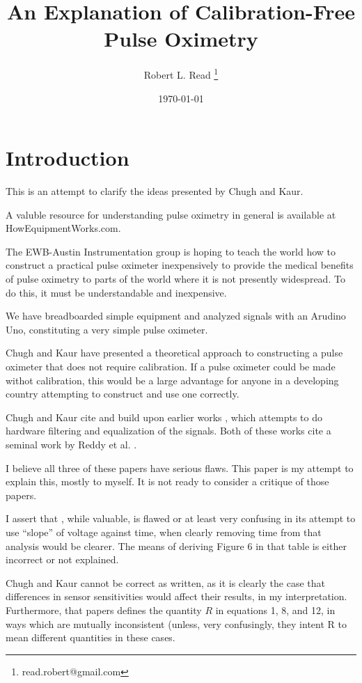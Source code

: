 \documentclass[11pt]{article}
\title{An Explanation of Calibration-Free Pulse Oximetry}
\author{Robert L. Read
  \thanks{read.robert@gmail.com}
}
\affil{Founder, Public Invention, an educational non-profit.}
\date{\today}
\begin{document}
\maketitle


\section{Introduction}

This is an attempt to clarify the ideas presented by Chugh and Kaur\cite{ChughAndKaur2015}.

A valuble resource for understanding pulse oximetry in general is available at HowEquipmentWorks.com\cite{howPulseOx}.

The EWB-Austin Instrumentation group is hoping to teach the world how to construct a practical pulse oximeter inexpensively to provide
the medical benefits of pulse oximetry to parts of the world where it is not presently widespread. To do this, it must be understandable
and inexpensive.

We have breadboarded simple equipment and analyzed signals with an Arudino Uno, constituting a very simple pulse oximeter.

Chugh and Kaur\cite{ChughAndKaur2015} have presented a theoretical approach to constructing a pulse oximeter that does not require calibration.
If a pulse oximeter could be made withot calibration, this would be a large advantage for anyone in a developing country attempting to construct
and use one correctly.

Chugh and Kaur\cite{ChughAndKaur2015} cite and build upon earlier works \cite{harini2014design}, which attempts to do hardware filtering
and equalization of the signals. Both of these works cite a seminal work by Reddy et al. \cite{reddy2009novel}.

I believe all three of these papers have serious flaws. This paper is my attempt to explain this, mostly to myself. It
is not ready to consider a critique of those papers.

I assert that \cite{reddy2009novel}, while valuable, is flawed or at least very confusing in its attempt to use ``slope'' of voltage against
time, when clearly removing time from that analysis would be clearer. The means of deriving Figure 6 in that table is either incorrect or
not explained.

Chugh and Kaur\cite{ChughAndKaur2015} cannot be correct as written, as it is clearly the case that differences in sensor sensitivities
would affect their results, in my interpretation. Furthermore, that papers defines the quantity $R$ in equations 1, 8, and 12, in ways
which are mutually inconsistent (unless, very confusingly, they intent R to mean different quantities in these cases.
\end{document}

